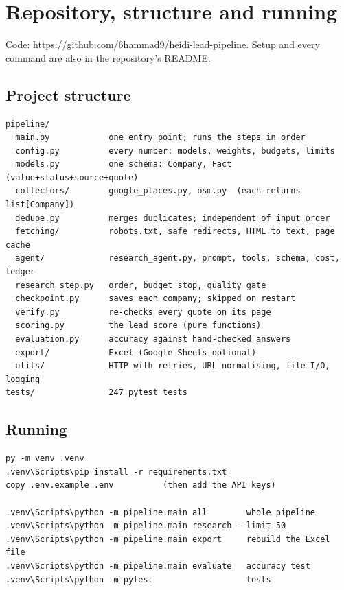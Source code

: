 \documentclass[11pt,a4paper]{article}
\newcommand{\repourl}{https://github.com/6hammad9/heidi-lead-pipeline}
\begin{document}
\section{Repository, structure and running}

Code: \url{\repourl}. Setup and every command are also in the repository's README.

\subsection{Project structure}
\begin{Verbatim}[fontsize=\small]
pipeline/
  main.py            one entry point; runs the steps in order
  config.py          every number: models, weights, budgets, limits
  models.py          one schema: Company, Fact (value+status+source+quote)
  collectors/        google_places.py, osm.py  (each returns list[Company])
  dedupe.py          merges duplicates; independent of input order
  fetching/          robots.txt, safe redirects, HTML to text, page cache
  agent/             research_agent.py, prompt, tools, schema, cost, ledger
  research_step.py   order, budget stop, quality gate
  checkpoint.py      saves each company; skipped on restart
  verify.py          re-checks every quote on its page
  scoring.py         the lead score (pure functions)
  evaluation.py      accuracy against hand-checked answers
  export/            Excel (Google Sheets optional)
  utils/             HTTP with retries, URL normalising, file I/O, logging
tests/               247 pytest tests
\end{Verbatim}

\subsection{Running}
\begin{Verbatim}[fontsize=\small]
py -m venv .venv
.venv\Scripts\pip install -r requirements.txt
copy .env.example .env          (then add the API keys)

.venv\Scripts\python -m pipeline.main all        whole pipeline
.venv\Scripts\python -m pipeline.main research --limit 50
.venv\Scripts\python -m pipeline.main export     rebuild the Excel file
.venv\Scripts\python -m pipeline.main evaluate   accuracy test
.venv\Scripts\python -m pytest                   tests
\end{Verbatim}

\end{document}
